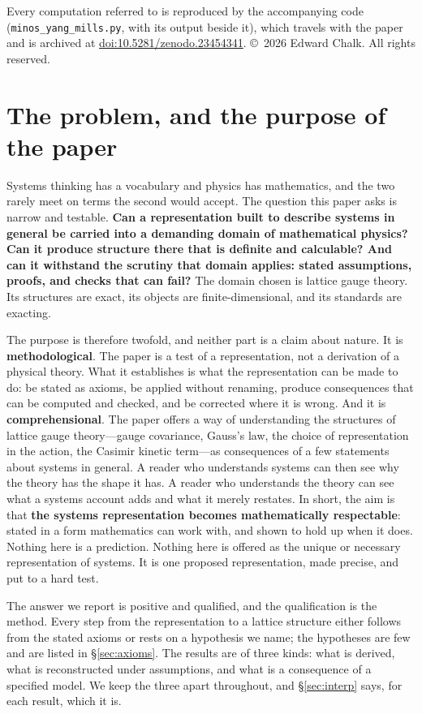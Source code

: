 \documentclass[11pt,a4paper]{article}
\theoremstyle{plain}
\theoremstyle{definition}
\theoremstyle{remark}
\begin{document}
\noindent\small Every computation referred to is reproduced by the accompanying code (\texttt{minos\_yang\_mills.py}, with its output beside it), which travels with the paper and is archived at \href{https://doi.org/10.5281/zenodo.23454341}{doi:10.5281/zenodo.23454341}. \copyright\ 2026 Edward Chalk. All rights reserved.
\normalsize

\section{The problem, and the purpose of the paper}

Systems thinking has a vocabulary and physics has mathematics, and the two rarely meet on terms the second would accept. The question this paper asks is narrow and testable. \textbf{Can a representation built to describe systems in general be carried into a demanding domain of mathematical physics? Can it produce structure there that is definite and calculable? And can it withstand the scrutiny that domain applies: stated assumptions, proofs, and checks that can fail?} The domain chosen is lattice gauge theory. Its structures are exact, its objects are finite-dimensional, and its standards are exacting.

The purpose is therefore twofold, and neither part is a claim about nature. It is \textbf{methodological}. The paper is a test of a representation, not a derivation of a physical theory. What it establishes is what the representation can be made to do: be stated as axioms, be applied without renaming, produce consequences that can be computed and checked, and be corrected where it is wrong. And it is \textbf{comprehensional}. The paper offers a way of understanding the structures of lattice gauge theory---gauge covariance, Gauss's law, the choice of representation in the action, the Casimir kinetic term---as consequences of a few statements about systems in general. A reader who understands systems can then see why the theory has the shape it has. A reader who understands the theory can see what a systems account adds and what it merely restates. In short, the aim is that \textbf{the systems representation becomes mathematically respectable}: stated in a form mathematics can work with, and shown to hold up when it does. Nothing here is a prediction. Nothing here is offered as the unique or necessary representation of systems. It is one proposed representation, made precise, and put to a hard test.

The answer we report is positive and qualified, and the qualification is the method. Every step from the representation to a lattice structure either follows from the stated axioms or rests on a hypothesis we name; the hypotheses are few and are listed in \S\ref{sec:axioms}. The results are of three kinds: what is derived, what is reconstructed under assumptions, and what is a consequence of a specified model. We keep the three apart throughout, and \S\ref{sec:interp} says, for each result, which it is.
\end{document}
